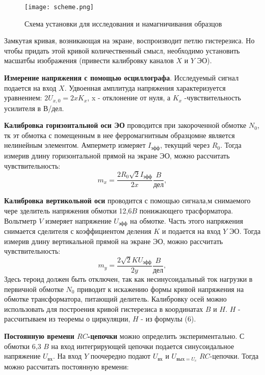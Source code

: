 \documentclass[12pt,a4paper]{article}
\begin{document}
\begin{figure}[H]
    \begin{center}
    \texttt{[image: scheme.png]}
    \caption{Схема установки для исследования и намагничивания образцов}
    \label{scheme} %
    \end{center}
\end{figure}

Замкутая кривая, возникающая на экране, воспроизводит петлю гистерезиса. Но чтобы придать этой кривой количественный смысл, необходимо установить
масшатбы изображения (привести калибровку каналов $X$ и $Y$ ЭО).

\textbf{Измерение напряжения с помощью осциллографа}.
Исследуемый сигнал подается на вход $X$. 
Удвоенная амплитуда напряжения характеризуется уравнением: $2U_{x,0}=2xK_x$, x - отклонение от нуля, а $K_x$ -чувствительность усилителя в В/дел.

\textbf{Калибровка горизонтальной оси ЭО} проводится при закороченной обмотке $N_0$, тк эт обмотка с помещенным в нее ферромагнитным образцомне является нелинейным элементом. Амперметр измеряет $I_{эфф}$, текущий через $R_0$.
Тогда измерив длину горизонтальной прямой на экране ЭО, можно рассчитать чувствительность:
\begin{equation}
    m_x = \frac{2R_0\sqrt{2}I_{эфф}}{2x} \frac{B}{дел}, \label{eq:ref}
\end{equation}

\textbf{Калибровка вертикольной оси} проводится с помощью сигнала,м снимаемого чере зделитель напряжения обмотки 12,6$B$ понижающего трасформатора. Вольтметр $V$ измеряет напряжение $U_{эфф}$ на обмотке. Часть этого напряжения снимается 
сделителя с коэффициентом деления $K$ и подается на вход $Y$ ЭО.
Тогда измерив длину вертикальной прямой на экране ЭО, можно рассчитать чувствительность:
\begin{equation}
    m_y = \frac{2\sqrt{2}KU_{эфф}}{2y} \frac{B}{дел}, \label{eq:ref}
\end{equation}
Здесь тероид должен быть отключен, так как несинусоидальный ток нагрузки в первичной обмотке $N_0$ приводит к искажению формы кривой напряжения на обмотке трансформатора, питающий делитель.
Калибровку осей можно использовать для построения кривой гистерезиса в координатах $B$ и $H$. $H$ - рассчитываем из теоремы о циркуляции, $H$ - из формулы (6). 

\textbf{Постоянную времени $RC$-цепочки} можно определить экспериментально. С обмотки 6,3 $B$ на вход интегрирующей цепочки подается синусоидальное напряжение $U_{вх}$. На вход $Y$ поочередно подают $U_{вх}$ и $U_{вых = U_c}$ $RC$-цепочки. 
Тогда можно рассчитать постоянную времени:
\end{document}
